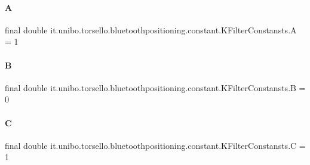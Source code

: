 \paragraph{\texorpdfstring{A}{A}}
{\footnotesize\ttfamily final double it.\+unibo.\+torsello.\+bluetoothpositioning.\+constant.\+K\+Filter\+Constansts.\+A = 1\hspace{0.3cm}{\ttfamily [static]}}

\hypertarget{classit_1_1unibo_1_1torsello_1_1bluetoothpositioning_1_1constant_1_1KFilterConstansts_a6fbe3fca27e3c7ef2df6aa9867685ff1_a6fbe3fca27e3c7ef2df6aa9867685ff1}{}\label{classit_1_1unibo_1_1torsello_1_1bluetoothpositioning_1_1constant_1_1KFilterConstansts_a6fbe3fca27e3c7ef2df6aa9867685ff1_a6fbe3fca27e3c7ef2df6aa9867685ff1} 
\paragraph{\texorpdfstring{B}{B}}
{\footnotesize\ttfamily final double it.\+unibo.\+torsello.\+bluetoothpositioning.\+constant.\+K\+Filter\+Constansts.\+B = 0\hspace{0.3cm}{\ttfamily [static]}}

\hypertarget{classit_1_1unibo_1_1torsello_1_1bluetoothpositioning_1_1constant_1_1KFilterConstansts_a4358950bbe93132edc3683ef9920a8a9_a4358950bbe93132edc3683ef9920a8a9}{}\label{classit_1_1unibo_1_1torsello_1_1bluetoothpositioning_1_1constant_1_1KFilterConstansts_a4358950bbe93132edc3683ef9920a8a9_a4358950bbe93132edc3683ef9920a8a9} 
\paragraph{\texorpdfstring{C}{C}}
{\footnotesize\ttfamily final double it.\+unibo.\+torsello.\+bluetoothpositioning.\+constant.\+K\+Filter\+Constansts.\+C = 1\hspace{0.3cm}{\ttfamily [static]}}

